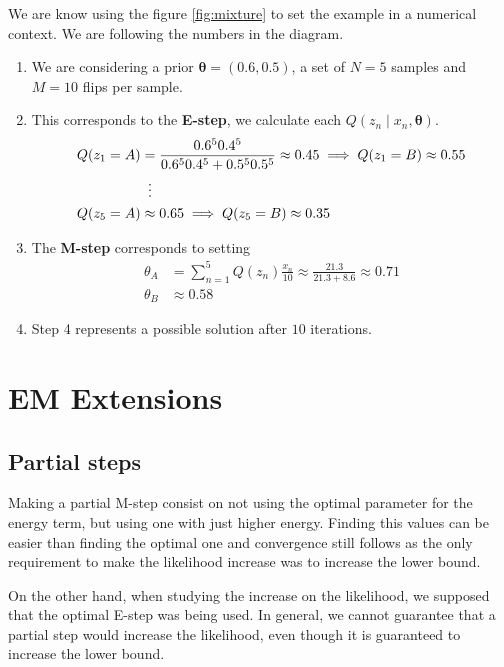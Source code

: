 We are know using the figure \ref{fig:mixture} to set the example in a numerical context. We are following the numbers in the diagram.
\begin{enumerate}
  \item We are considering a prior \(\bm{\theta} = (0.6, 0.5)\), a set of \(N = 5\) samples and \(M = 10\) flips per sample.
  \item This corresponds to the \textbf{E-step}, we calculate each \(Q(z_{n}\mid x_{n}, \bm{\theta})\).
    \[
    \begin{aligned}
      Q(z_{1} = A) &= \frac{0.6^{5} 0.4^{5}}{0.6^{5}0.4^{5} + 0.5^{5}0.5^{5}} \approx 0.45 \implies Q(z_{1} = B) \approx 0.55\\
      &\mathrel{\makebox[\widthof{=}]{\vdots}} \\
      Q(z_{5} = A) &\approx 0.65 \implies Q(z_{5}=B) \approx 0.35
    \end{aligned}
    \]
  \item The \textbf{M-step} corresponds to setting
    \[
    \begin{aligned}
      \theta_{A} &= \sum_{n=1}^{5}Q(z_{n})\frac{x_{n}}{10} \approx \frac{21.3}{21.3 + 8.6} \approx 0.71\\
      \theta_{B} &\approx 0.58
    \end{aligned}
    \]
  \item Step 4 represents a possible solution after \(10\) iterations.
\end{enumerate}


\section{EM Extensions}
\subsection{Partial steps}

Making a partial M-step consist on not using the optimal parameter for the energy term, but using one with just higher energy. Finding this values can be easier than finding the optimal one and convergence still follows as the only requirement to make the likelihood increase was to increase the lower bound.

On the other hand, when studying the increase on the likelihood, we supposed that the optimal E-step was being used. In general, we cannot guarantee that a partial step would increase the likelihood, even though it is guaranteed to increase the lower bound.

